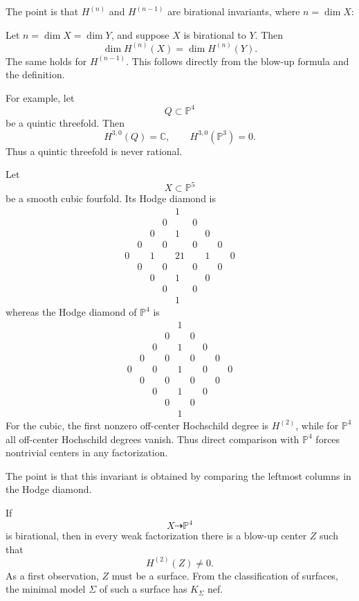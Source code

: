 \noindent
The point is that $H^{(n)}$ and $H^{(n-1)}$
are birational invariants, where $n=\dim X$:

\begin{example}
\label{example-let-n}
Let $n=\dim X=\dim Y$, and suppose
$X$ is birational to $Y$.
Then
\[
\dim H^{(n)}(X)=\dim H^{(n)}(Y).
\]
The same holds for $H^{(n-1)}$.
This follows directly from the
blow-up formula and the definition.

For example, let
\[
Q\subset \mathbb{P}^4
\]
be a quintic threefold.
Then
\[
H^{3,0}(Q)=\mathbb{C},
\qquad
H^{3,0}(\mathbb{P}^3)=0.
\]
Thus a quintic threefold is never
rational.
\end{example}

\begin{example}
\label{example-let-x}
Let
\[
X\subset \mathbb{P}^5
\]
be a smooth cubic fourfold.
Its Hodge diamond is
\[
\begin{array}{ccccccccc}
&&&&1&&&&\\
&&&0&&0&&&\\
&&0&&1&&0&&\\
&0&&0&&0&&0&\\
0&&1&&21&&1&&0\\
&0&&0&&0&&0&\\
&&0&&1&&0&&\\
&&&0&&0&&&\\
&&&&1&&&&
\end{array}
\]
whereas the Hodge diamond of
$\mathbb{P}^4$ is
\[
\begin{array}{ccccccccc}
&&&&1&&&&\\
&&&0&&0&&&\\
&&0&&1&&0&&\\
&0&&0&&0&&0&\\
0&&0&&1&&0&&0\\
&0&&0&&0&&0&\\
&&0&&1&&0&&\\
&&&0&&0&&&\\
&&&&1&&&&
\end{array}
\]
For the cubic, the first nonzero
off-center Hochschild degree is
$H^{(2)}$, while for $\mathbb{P}^4$
all off-center Hochschild degrees
vanish.
Thus direct comparison with
$\mathbb{P}^4$ forces nontrivial
centers in any factorization.

The point is that this invariant is obtained
by comparing the leftmost columns in the
Hodge diamond.
\end{example}

If
\[
X\dashrightarrow \mathbb{P}^4
\]
is birational, then in every weak
factorization there is a blow-up
center $Z$ such that
\[
H^{(2)}(Z)\neq 0.
\]
As a first observation, $Z$ must be a
surface.
From the classification of surfaces,
the minimal model $\Sigma$ of such a
surface has $K_\Sigma$ nef.

